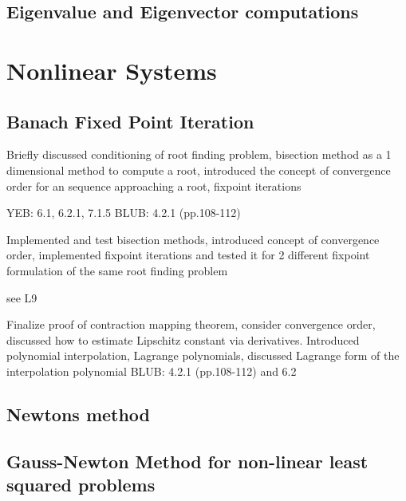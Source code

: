 \documentclass{article}
\theoremstyle{remark}
\begin{document}
\subsection{Eigenvalue and Eigenvector computations}%
\label{sub:eigenvalue_and_eigenvector_computations}

\newpage
\section{Nonlinear Systems}%
\label{sec:nonlinear_systems}

\subsection{Banach Fixed Point Iteration}%
\label{sub:banach_fixed_point_iteration}
\begin{tcolorbox}
  Briefly discussed conditioning of root finding problem, bisection method as a 1 dimensional method to compute a root, introduced the concept of convergence order for an sequence approaching a root, fixpoint iterations
  \par
  YEB: 6.1, 6.2.1, 7.1.5
  BLUB: 4.2.1 (pp.108-112)
\end{tcolorbox}

\begin{tcolorbox}
  Implemented and test bisection methods, introduced concept of convergence order, implemented fixpoint iterations and tested it for 2 different fixpoint formulation of the same root finding problem 
  \par
  see L9
\end{tcolorbox}

\begin{tcolorbox}
  Finalize proof of contraction mapping theorem, consider convergence order, discussed how to estimate Lipschitz constant via derivatives. Introduced polynomial interpolation, Lagrange polynomials, discussed Lagrange form of the interpolation polynomial	
  BLUB: 4.2.1 (pp.108-112) and 6.2
\end{tcolorbox}
\subsection{Newtons method}%
\label{sub:newtons_method}

\subsection{Gauss-Newton Method for non-linear least squared problems}%
\label{sub:gauss_newton_method_for_non_linear_least_squared_problems}
\end{document}
